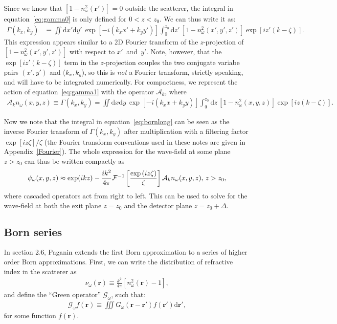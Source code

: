 \documentclass{article}
\begin{document}
Since we know that $\left[1 - n_{\omega}^2(\bm{r}')\right] = 0$ outside the
scatterer, the integral in equation~\ref{eq:gamma0} is only defined for
$0 < z < z_0$. We can thus write it as:
\begin{align}
  \Gamma(k_x, k_y) &\equiv \iint \mathrm{d}x' \mathrm{d}y'\,\exp\left[-i\left(k_x x' + k_y y'\right)\right]\int_0^{z_0}\mathrm{d}z'\,\left[1 - n_{\omega}^2(x',y',z')\right]\exp\left[iz'(k - \zeta)\right].\label{eq:gamma1}
\end{align}
This expression appears similar to a 2D Fourier transform of the $z$-projection
of $\left[1 - n_{\omega}^2(x',y',z')\right]$ with respect to $x'$~and~$y'$.
Note, however, that the $\exp\left[iz'(k-\zeta)\right]$ term in the
$z$-projection couples the two conjugate variabe pairs $(x', y')$ and
($k_x, k_y$), so this is \textit{not} a Fourier transform, strictly speaking,
and will have to be integrated numerically. For compactness, we represent the
action of equation~\ref{eq:gamma1} with the operator $\mathcal{A}_k$, where
\begin{align}
  \mathcal{A}_k n_{\omega}(x,y,z) \equiv \Gamma(k_x, k_y) =\iint \mathrm{d}x \mathrm{d}y\,\exp\left[-i\left(k_x x + k_y y\right)\right]\int_0^{z_0}\mathrm{d}z\,\left[1 - n_{\omega}^2(x,y,z)\right]\exp\left[iz(k - \zeta)\right].
\end{align}

Now we note that the integral in equation~\ref{eq:bornlong} can be seen as the
inverse Fourier transform of $\Gamma(k_x, k_y)$ after multiplication with a
filtering factor $\exp\left[iz\zeta\right]/\zeta$ (the Fourier transform
conventions used in these notes are given in Appendix~\ref{Fourier}). The whole
expression for the wave-field at some plane $z > z_0$ can thus be written
compactly as
\begin{align}
  \psi_{\omega}(x,y,z) \approx \exp(ikz) - \frac{ik^2}{4\pi}\mathcal{F}^{-1}\left[\frac{\exp\left(iz\zeta\right)}{\zeta}\right]\mathcal{A}_k n_{\omega}(x,y,z)\text{, } z > z_0,
  \label{eq:firstbornapproximation}
\end{align}
where cascaded operators act from right to left. This can be used to solve for
the wave-field at both the exit plane $z=z_0$ and the detector plane
$z = z_0 + \Delta$.

\subsection{Born series}
In section 2.6, Paganin extends the first Born approximation to a series of
higher order Born approximations. First, we can write the distribution of
refractive index in the scatterer as
\begin{align}
  \nu_{\omega}(\bm{r}) \equiv \frac{k^2}{4\pi}\left[n_{\omega}^2(\bm{r}) - 1\right],
\end{align}
and define the ``Green operator'' $\mathcal{G}_{\omega}$, such that:
\begin{align}
  \mathcal{G}_{\omega} f(\bm{r}) \equiv \iiint G_{\omega}(\bm{r} - \bm{r}')f(\bm{r}')\mathrm{d}\bm{r}',
\end{align}
for some function $f(\bm{r})$.
\end{document}

